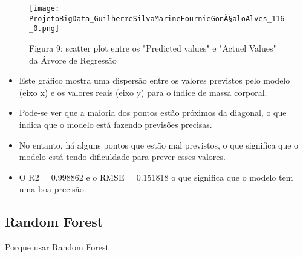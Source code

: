 \documentclass[11pt]{article}
\providecommand{\tightlist}{%
      \setlength{\itemsep}{0pt}\setlength{\parskip}{0pt}}
\begin{document}
\begin{figure}[h]
   \centering
   \texttt{[image: ProjetoBigData\_GuilhermeSilvaMarineFournieGonÃ§aloAlves\_116\_0.png]}
   \pagebreak
    \caption{Figura 9: scatter plot entre os "Predicted values" e "Actuel Values" da Árvore de Regressão}
    \pagebreak
   \label{fig:scatter plot1}
\end{figure}

    
    \begin{itemize}
\tightlist
\item
  Este gráfico mostra uma dispersão entre os valores previstos pelo
  modelo (eixo x) e os valores reais (eixo y) para o índice de massa
  corporal.
\item
  Pode-se ver que a maioria dos pontos estão próximos da diagonal, o que
  indica que o modelo está fazendo previsões precisas.
\item
  No entanto, há alguns pontos que estão mal previstos, o que significa
  que o modelo está tendo dificuldade para prever esses valores.
\item
  O R2 = 0.998862 e o RMSE = 0.151818 o que significa que o modelo tem
  uma boa precisão.
\end{itemize}

    \hypertarget{random-forest}{%
\subsection{Random Forest}\label{random-forest}}

Porque usar Random Forest
\end{document}
